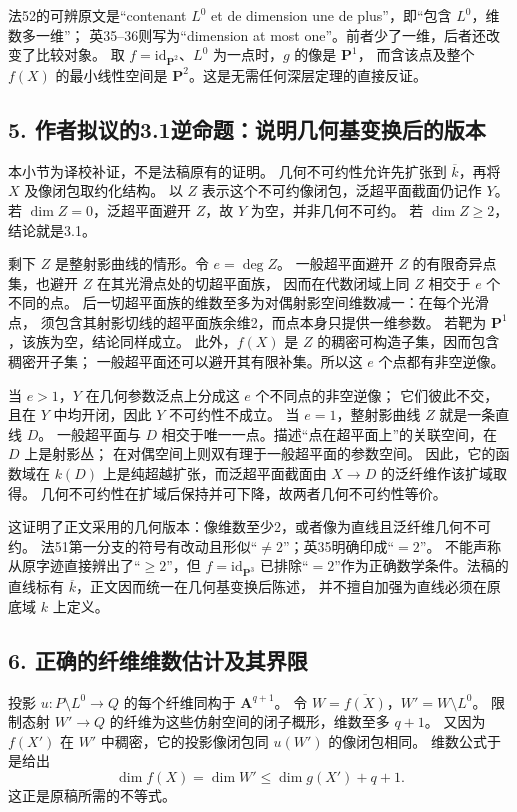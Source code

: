 \documentclass[UTF8,a4paper]{ctexbook}
\begin{document}
法52的可辨原文是“contenant $L^0$ et de dimension une de plus”，即“包含 $L^0$，维数多一维”；
英35--36则写为“dimension at most one”。前者少了一维，后者还改变了比较对象。
取 $f=\mathrm{id}_{\mathbf P^2}$、$L^0$ 为一点时，$g$ 的像是 $\mathbf P^1$，
而含该点及整个 $f(X)$ 的最小线性空间是 $\mathbf P^2$。这是无需任何深层定理的直接反证。

\subsection*{5. 作者拟议的3.1逆命题：说明几何基变换后的版本}

本小节为译校补证，不是法稿原有的证明。
几何不可约性允许先扩张到 $\overline k$，再将 $X$ 及像闭包取约化结构。
以 $Z$ 表示这个不可约像闭包，泛超平面截面仍记作 $Y$。
若 $\dim Z=0$，泛超平面避开 $Z$，故 $Y$ 为空，并非几何不可约。
若 $\dim Z\ge2$，结论就是3.1。

剩下 $Z$ 是整射影曲线的情形。令 $e=\deg Z$。
一般超平面避开 $Z$ 的有限奇异点集，也避开 $Z$ 在其光滑点处的切超平面族，
因而在代数闭域上同 $Z$ 相交于 $e$ 个不同的点。
后一切超平面族的维数至多为对偶射影空间维数减一：在每个光滑点，
须包含其射影切线的超平面族余维2，而点本身只提供一维参数。
若靶为 $\mathbf P^1$，该族为空，结论同样成立。
此外，$f(X)$ 是 $Z$ 的稠密可构造子集，因而包含稠密开子集；
一般超平面还可以避开其有限补集。所以这 $e$ 个点都有非空逆像。

当 $e>1$，$Y$ 在几何参数泛点上分成这 $e$ 个不同点的非空逆像；
它们彼此不交，且在 $Y$ 中均开闭，因此 $Y$ 不可约性不成立。
当 $e=1$，整射影曲线 $Z$ 就是一条直线 $D$。
一般超平面与 $D$ 相交于唯一一点。描述“点在超平面上”的关联空间，在 $D$ 上是射影丛；
在对偶空间上则双有理于一般超平面的参数空间。
因此，它的函数域在 $k(D)$ 上是纯超越扩张，而泛超平面截面由 $X\to D$ 的泛纤维作该扩域取得。
几何不可约性在扩域后保持并可下降，故两者几何不可约性等价。

这证明了正文采用的几何版本：像维数至少2，或者像为直线且泛纤维几何不可约。
法51第一分支的符号有改动且形似“$\ne2$”；英35明确印成“$=2$”。
不能声称从原字迹直接辨出了“$\ge2$”，但 $f=\mathrm{id}_{\mathbf P^3}$
已排除“$=2$”作为正确数学条件。法稿的直线标有 $\overline k$，正文因而统一在几何基变换后陈述，
并不擅自加强为直线必须在原底域 $k$ 上定义。

\subsection*{6. 正确的纤维维数估计及其界限}

投影 $u:P\setminus L^0\to Q$ 的每个纤维同构于 $\mathbf A^{q+1}$。
令 $W=\overline{f(X)}$，$W'=W\setminus L^0$。
限制态射 $W'\to Q$ 的纤维为这些仿射空间的闭子概形，维数至多 $q+1$。
又因为 $f(X')$ 在 $W'$ 中稠密，它的投影像闭包同 $u(W')$ 的像闭包相同。
维数公式于是给出
\[
 \dim f(X)=\dim W'\leq\dim g(X')+q+1.
\]
这正是原稿所需的不等式。
\end{document}
